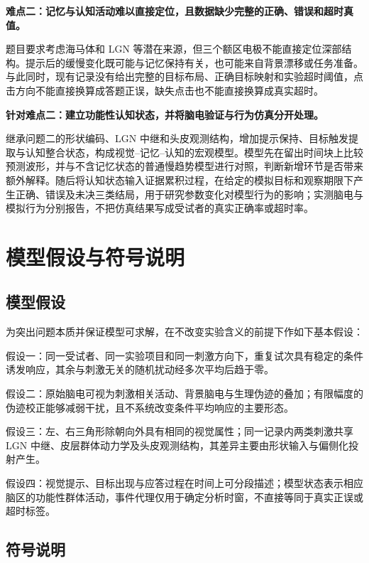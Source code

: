 \documentclass[a4paper]{ctexart}
\numberwithin{figure}{section}       %
\begin{document}
\noindent\textbf{难点二：记忆与认知活动难以直接定位，且数据缺少完整的正确、错误和超时真值。}

题目要求考虑海马体和 LGN 等潜在来源，但三个额区电极不能直接定位深部结构。提示后的缓慢变化既可能与记忆保持有关，也可能来自背景漂移或任务准备。与此同时，现有记录没有给出完整的目标布局、正确目标映射和实验超时阈值，点击方向不能直接换算成答题正误，缺失点击也不能直接换算成真实超时。

\noindent\textbf{针对难点二：建立功能性认知状态，并将脑电验证与行为仿真分开处理。}

继承问题二的形状编码、LGN 中继和头皮观测结构，增加提示保持、目标触发提取与认知整合状态，构成视觉--记忆--认知的宏观模型。模型先在留出时间块上比较预测波形，并与不含记忆状态的普通慢趋势模型进行对照，判断新增环节是否带来额外解释。随后将认知状态输入证据累积过程，在给定的模拟目标和观察期限下产生正确、错误及未决三类结局，用于研究参数变化对模型行为的影响；实测脑电与模拟行为分别报告，不把仿真结果写成受试者的真实正确率或超时率。


\newpage
\section{模型假设与符号说明}

\subsection{模型假设}

为突出问题本质并保证模型可求解，在不改变实验含义的前提下作如下基本假设：

假设一：同一受试者、同一实验项目和同一刺激方向下，重复试次具有稳定的条件诱发响应，其余与刺激无关的随机扰动经多次平均后趋于零。

假设二：原始脑电可视为刺激相关活动、背景脑电与生理伪迹的叠加；有限幅度的伪迹校正能够减弱干扰，且不系统改变条件平均响应的主要形态。

假设三：左、右三角形除朝向外具有相同的视觉属性；同一记录内两类刺激共享 LGN 中继、皮层群体动力学及头皮观测结构，其差异主要由形状输入与偏侧化投射产生。

假设四：视觉提示、目标出现与应答过程在时间上可分段描述；模型状态表示相应脑区的功能性群体活动，事件代理仅用于确定分析时窗，不直接等同于真实正误或超时标签。


\subsection{符号说明}
\end{document}
